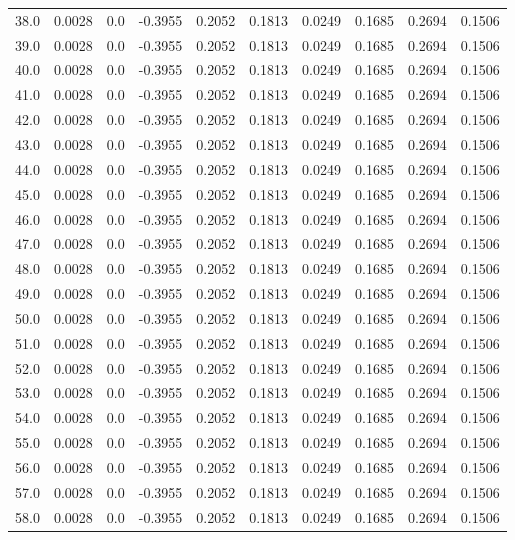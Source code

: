 \begin{longtable}{lrrrrrrrrr}
38.0 & 0.0028 & 0.0 & -0.3955 & 0.2052 & 0.1813 & 0.0249 & 0.1685 & 0.2694 & 0.1506 \\
39.0 & 0.0028 & 0.0 & -0.3955 & 0.2052 & 0.1813 & 0.0249 & 0.1685 & 0.2694 & 0.1506 \\
40.0 & 0.0028 & 0.0 & -0.3955 & 0.2052 & 0.1813 & 0.0249 & 0.1685 & 0.2694 & 0.1506 \\
41.0 & 0.0028 & 0.0 & -0.3955 & 0.2052 & 0.1813 & 0.0249 & 0.1685 & 0.2694 & 0.1506 \\
42.0 & 0.0028 & 0.0 & -0.3955 & 0.2052 & 0.1813 & 0.0249 & 0.1685 & 0.2694 & 0.1506 \\
43.0 & 0.0028 & 0.0 & -0.3955 & 0.2052 & 0.1813 & 0.0249 & 0.1685 & 0.2694 & 0.1506 \\
44.0 & 0.0028 & 0.0 & -0.3955 & 0.2052 & 0.1813 & 0.0249 & 0.1685 & 0.2694 & 0.1506 \\
45.0 & 0.0028 & 0.0 & -0.3955 & 0.2052 & 0.1813 & 0.0249 & 0.1685 & 0.2694 & 0.1506 \\
46.0 & 0.0028 & 0.0 & -0.3955 & 0.2052 & 0.1813 & 0.0249 & 0.1685 & 0.2694 & 0.1506 \\
47.0 & 0.0028 & 0.0 & -0.3955 & 0.2052 & 0.1813 & 0.0249 & 0.1685 & 0.2694 & 0.1506 \\
48.0 & 0.0028 & 0.0 & -0.3955 & 0.2052 & 0.1813 & 0.0249 & 0.1685 & 0.2694 & 0.1506 \\
49.0 & 0.0028 & 0.0 & -0.3955 & 0.2052 & 0.1813 & 0.0249 & 0.1685 & 0.2694 & 0.1506 \\
50.0 & 0.0028 & 0.0 & -0.3955 & 0.2052 & 0.1813 & 0.0249 & 0.1685 & 0.2694 & 0.1506 \\
51.0 & 0.0028 & 0.0 & -0.3955 & 0.2052 & 0.1813 & 0.0249 & 0.1685 & 0.2694 & 0.1506 \\
52.0 & 0.0028 & 0.0 & -0.3955 & 0.2052 & 0.1813 & 0.0249 & 0.1685 & 0.2694 & 0.1506 \\
53.0 & 0.0028 & 0.0 & -0.3955 & 0.2052 & 0.1813 & 0.0249 & 0.1685 & 0.2694 & 0.1506 \\
54.0 & 0.0028 & 0.0 & -0.3955 & 0.2052 & 0.1813 & 0.0249 & 0.1685 & 0.2694 & 0.1506 \\
55.0 & 0.0028 & 0.0 & -0.3955 & 0.2052 & 0.1813 & 0.0249 & 0.1685 & 0.2694 & 0.1506 \\
56.0 & 0.0028 & 0.0 & -0.3955 & 0.2052 & 0.1813 & 0.0249 & 0.1685 & 0.2694 & 0.1506 \\
57.0 & 0.0028 & 0.0 & -0.3955 & 0.2052 & 0.1813 & 0.0249 & 0.1685 & 0.2694 & 0.1506 \\
58.0 & 0.0028 & 0.0 & -0.3955 & 0.2052 & 0.1813 & 0.0249 & 0.1685 & 0.2694 & 0.1506 \\

\end{longtable}
